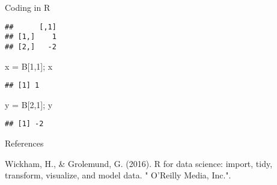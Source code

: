 \documentclass[ignorenonframetext,]{beamer}
\newenvironment{Shaded}{\begin{snugshade}}{\end{snugshade}}
\newcommand{\KeywordTok}[1]{\textcolor[rgb]{0.13,0.29,0.53}{\textbf{#1}}}
\newcommand{\DecValTok}[1]{\textcolor[rgb]{0.00,0.00,0.81}{#1}}
\newcommand{\StringTok}[1]{\textcolor[rgb]{0.31,0.60,0.02}{#1}}
\newcommand{\OperatorTok}[1]{\textcolor[rgb]{0.81,0.36,0.00}{\textbf{#1}}}
\newcommand{\NormalTok}[1]{#1}
\begin{document}
\begin{frame}[fragile]{Coding in R}

\begin{Shaded}
\end{Shaded}

\begin{verbatim}
##      [,1]
## [1,]    1
## [2,]   -2
\end{verbatim}

\begin{Shaded}
\begin{Highlighting}[]
\NormalTok{x =}\StringTok{ }\NormalTok{B[}\DecValTok{1}\NormalTok{,}\DecValTok{1}\NormalTok{]; x}
\end{Highlighting}
\end{Shaded}

\begin{verbatim}
## [1] 1
\end{verbatim}

\begin{Shaded}
\begin{Highlighting}[]
\NormalTok{y =}\StringTok{ }\NormalTok{B[}\DecValTok{2}\NormalTok{,}\DecValTok{1}\NormalTok{]; y}
\end{Highlighting}
\end{Shaded}

\begin{verbatim}
## [1] -2
\end{verbatim}

\end{frame}

\begin{frame}{References}

\begin{thebibliography}{99}
Wickham, H., \& Grolemund, G. (2016). R for data science: import, tidy, transform, visualize, and model data. " O'Reilly Media, Inc.".
\end{thebibliography}

\end{frame}
\end{document}
